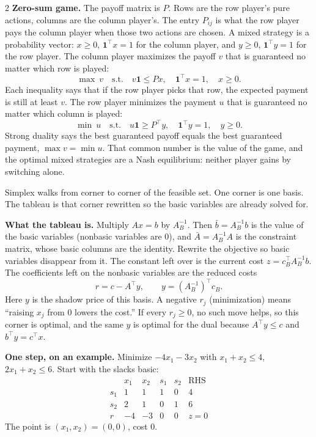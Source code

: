 \documentclass{article}
\newcommand{\sect}[1]{\par\vspace{1.2pt}{\fontsize{8}{9.2}\selectfont\textbf{#1}}\par\vspace{0.2pt}}
\newcommand{\kw}[1]{\textbf{#1}}
\begin{document}
\begin{multicols}{2}
\kw{Zero-sum game.} The payoff matrix is $P$. Rows are the row player's pure actions, columns are the column player's. The entry $P_{ij}$ is what the row player pays the column player when those two actions are chosen. A mixed strategy is a probability vector: $x\ge 0$, $\mathbf{1}^\top x=1$ for the column player, and $y\ge 0$, $\mathbf{1}^\top y=1$ for the row player. The column player maximizes the payoff $v$ that is guaranteed no matter which row is played:
\[
\max\ v \quad\text{s.t.}\quad v\mathbf{1}\le Px,\quad \mathbf{1}^\top x=1,\quad x\ge 0.
\]
Each inequality says that if the row player picks that row, the expected payment is still at least $v$. The row player minimizes the payment $u$ that is guaranteed no matter which column is played:
\[
\min\ u \quad\text{s.t.}\quad u\mathbf{1}\ge P^\top y,\quad \mathbf{1}^\top y=1,\quad y\ge 0.
\]
Strong duality says the best guaranteed payoff equals the best guaranteed payment, $\max v=\min u$. That common number is the value of the game, and the optimal mixed strategies are a Nash equilibrium: neither player gains by switching alone.

\sect{4. The Simplex Method}
Simplex walks from corner to corner of the feasible set. One corner is one basis. The tableau is that corner rewritten so the basic variables are already solved for.

\kw{What the tableau is.} Multiply $Ax=b$ by $A_B^{-1}$. Then $\bar b=A_B^{-1}b$ is the value of the basic variables (nonbasic variables are $0$), and $\bar A=A_B^{-1}A$ is the constraint matrix, whose basic columns are the identity. Rewrite the objective so basic variables disappear from it. The constant left over is the current cost $z=c_B^\top A_B^{-1}b$. The coefficients left on the nonbasic variables are the reduced costs
\[
r=c-A^\top y,\qquad y=(A_B^{-1})^\top c_B.
\]
Here $y$ is the shadow price of this basis. A negative $r_j$ (minimization) means ``raising $x_j$ from $0$ lowers the cost.'' If every $r_j\ge 0$, no such move helps, so this corner is optimal, and the same $y$ is optimal for the dual because $A^\top y\le c$ and $b^\top y=c^\top x$.

\kw{One step, on an example.} Minimize $-4x_1-3x_2$ with $x_1+x_2\le 4$, $2x_1+x_2\le 6$. Start with the slacks basic:
\[
\begin{array}{c|rrrr|r}
 & x_1 & x_2 & s_1 & s_2 & \mathrm{RHS}\\
\hline
s_1 & 1 & 1 & 1 & 0 & 4\\
s_2 & 2 & 1 & 0 & 1 & 6\\
r & -4 & -3 & 0 & 0 & z=0
\end{array}
\]
The point is $(x_1,x_2)=(0,0)$, cost $0$.


\end{multicols}
\end{document}
